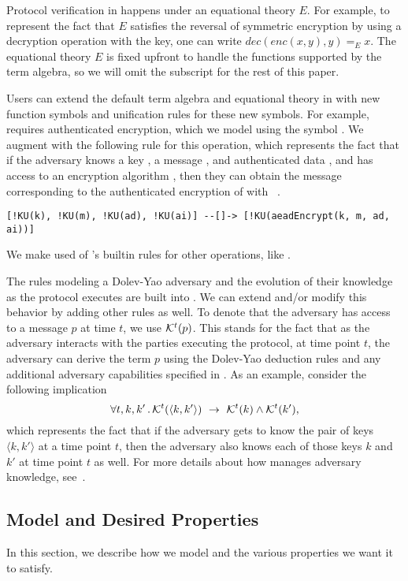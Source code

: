 Protocol verification in \mTamarin{} happens under an equational theory $E$.
%
For example, to represent the fact that $E$ satisfies the reversal of
symmetric encryption by using a decryption operation with the key,
one can write $\textit{dec}(\textit{enc}(x, y), y) =_{E} x$.
%
The equational theory $E$ is fixed upfront to handle the functions supported by
the term algebra, so we will omit the subscript for the rest of this paper.
%

Users can extend the default term algebra and equational theory in
\mTamarin{} with new function symbols and unification rules for these new symbols.
%
For example, \mEdhoc{} requires authenticated encryption, which we model using
the symbol .
%
We augment \mTamarin{} with the following rule for this operation,
which represents the fact that if the adversary knows a key ,
a message , and authenticated data ,
and has access to an encryption algorithm ,
then they can obtain the message corresponding to the authenticated encryption
of  with ~\cite{Norr21}.
%
\begin{verbatim}
[!KU(k), !KU(m), !KU(ad), !KU(ai)] --[]-> [!KU(aeadEncrypt(k, m, ad, ai))]
\end{verbatim}
%
We make used of \mTamarin{}'s builtin rules for other operations, like \mXor{}.
%

The rules modeling a Dolev-Yao adversary and the evolution of their knowledge
as the protocol executes are built into \mTamarin.
%
We can extend and/or modify this behavior by adding other rules as well.
%
To denote that the adversary has access to a message $p$ at time $t$, we use $\mathcal{K}^{t}(p)$.
%
This stands for the fact that as the adversary interacts with the parties
executing the protocol, at time point $t$, the adversary can derive the
term $p$ using the Dolev-Yao deduction rules and any additional adversary
capabilities specified in \mTamarin.
%
As an example, consider the following implication
\[
    \forall t, k, k'\operatorname{.} \mathcal{K}^{t}(\langle k, k'\rangle)\ \rightarrow\
\mathcal{K}^{t}(k) \land \mathcal{K}^{t}(k'),
\]
which represents the fact that if the adversary gets to know the pair of
keys $\langle k, k' \rangle$ at a time point $t$, then the adversary also
knows each of those keys $k$ and $k'$ at time point $t$ as well.
%
For more details about how \mTamarin{} manages adversary knowledge,
see~\cite{DBLP:conf/cav/MeierSCB13}.
%

\subsection{Model and Desired Properties}
\label{sec:desired-properties}
In this section, we describe how we model \mEdhoc{} and the various properties
we want it to satisfy.
%

